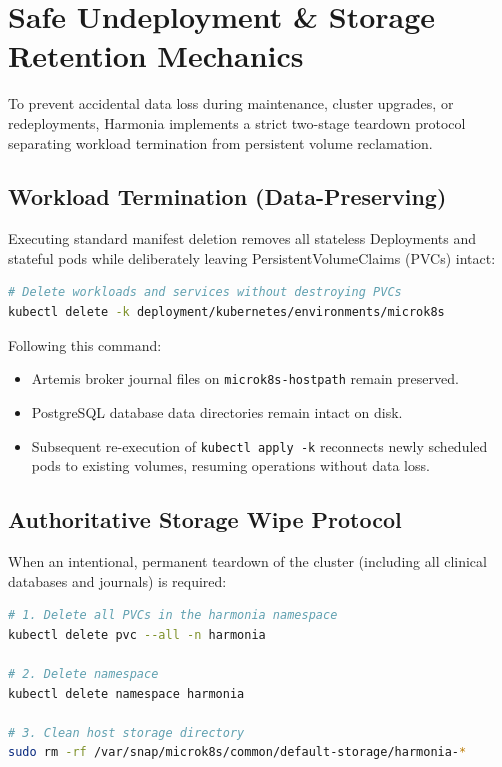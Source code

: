 
\chapter{Safe Undeployment \& Storage Retention Mechanics}
\label{chap:undeployment_retention}

To prevent accidental data loss during maintenance, cluster upgrades, or redeployments, Harmonia implements a strict two-stage teardown protocol separating workload termination from persistent volume reclamation.

\section{Workload Termination (Data-Preserving)}

Executing standard manifest deletion removes all stateless Deployments and stateful pods while deliberately leaving PersistentVolumeClaims (PVCs) intact:
\begin{lstlisting}[language=bash, caption={Data-Preserving Workload Teardown}]
# Delete workloads and services without destroying PVCs
kubectl delete -k deployment/kubernetes/environments/microk8s
\end{lstlisting}
Following this command:
\begin{itemize}
    \item Artemis broker journal files on \texttt{microk8s-hostpath} remain preserved.
    \item PostgreSQL database data directories remain intact on disk.
    \item Subsequent re-execution of \texttt{kubectl apply -k} reconnects newly scheduled pods to existing volumes, resuming operations without data loss.
\end{itemize}

\section{Authoritative Storage Wipe Protocol}

When an intentional, permanent teardown of the cluster (including all clinical databases and journals) is required:
\begin{lstlisting}[language=bash, caption={Permanent Storage Deletion Commands}]
# 1. Delete all PVCs in the harmonia namespace
kubectl delete pvc --all -n harmonia

# 2. Delete namespace
kubectl delete namespace harmonia

# 3. Clean host storage directory
sudo rm -rf /var/snap/microk8s/common/default-storage/harmonia-*
\end{lstlisting}

\newpage

